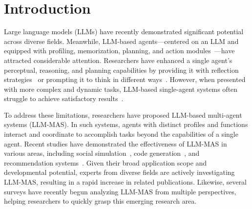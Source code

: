 \section{Introduction}
Large language models (LLMs) have recently demonstrated significant potential across diverse fields. Meanwhile, LLM-based agents—centered on an LLM and equipped with profiling, memorization, planning, and action modules~\cite{llm_agent_define}—have attracted considerable attention. Researchers have enhanced a single agent’s perceptual, reasoning, and planning capabilities by providing it with reflection strategies~\cite{react} or prompting it to think in different ways~\cite{COT,TOT}. However, when presented with more complex and dynamic tasks, LLM-based single-agent systems often struggle to achieve satisfactory results~\cite{single_limit}.

To address these limitations, researchers have proposed LLM-based multi-agent systems (LLM-MAS). In such systems, agents with distinct profiles and functions interact and coordinate to accomplish tasks beyond the capabilities of a single agent. Recent studies have demonstrated the effectiveness of LLM-MAS in various areas, including social simulation~\cite{social_media_regulation}, code generation~\cite{metagpt}, and recommendation systems~\cite{jd_recommendation_system}. Given their broad application scope and developmental potential, experts from diverse fields are actively investigating LLM-MAS, resulting in a rapid increase in related publications. Likewise, several surveys have recently begun analyzing LLM-MAS from multiple perspectives, helping researchers to quickly grasp this emerging research area.

